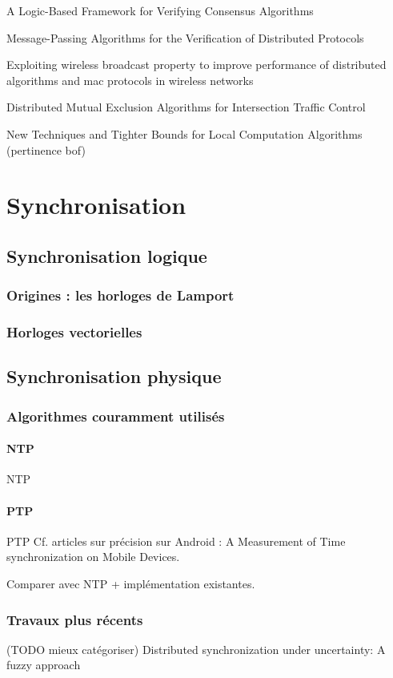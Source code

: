A Logic-Based Framework for Verifying Consensus Algorithms

Message-Passing Algorithms for the Verification of Distributed Protocols

Exploiting wireless broadcast property to improve performance of distributed algorithms and mac protocols in wireless networks

Distributed Mutual Exclusion Algorithms for Intersection Traffic Control

New Techniques and Tighter Bounds for Local Computation Algorithms (pertinence bof)

\section{Synchronisation}

\subsection{Synchronisation logique}
\subsubsection{Origines : les horloges de Lamport}
\subsubsection{Horloges vectorielles}

\subsection{Synchronisation physique}
\subsubsection{Algorithmes couramment utilisés}
\paragraph{NTP}
\ac{NTP}
\paragraph{PTP}
\ac{PTP}
Cf. articles sur précision sur Android : 
A Measurement of Time synchronization on Mobile Devices.

Comparer avec NTP + implémentation existantes.

\subsubsection{Travaux plus récents}
(TODO mieux catégoriser)
Distributed synchronization under uncertainty: A fuzzy approach


